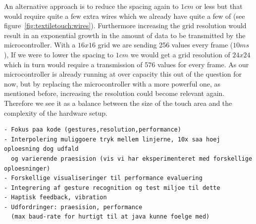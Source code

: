 An alternative approach is to reduce the spacing again to \(1cm\) or less but that would require quite a few extra wires which we already have quite a few of (see figure~\ref{fig:textiletouch:wires}).
Furthermore increasing the grid resolution would result in an exponential growth in the amount of data to be transmitted by the microcontroller.
With a \(16x16\) grid we are sending 256 values every frame (\(10ms\)),
If we were to lower the spacing to \(1cm\) we would get a grid resolution of \(24x24\) which in turn would require a transmission of 576 values for every frame.
As our microcontroller is already running at over capacity this out of the question for now, but by replacing the microcontroller with a more powerful one, as mentioned before, increasing the resolution could become relevant again.
Therefore we see it as a balance between the size of the touch area and the complexity of the hardware setup.

\begin{verbatim}
- Fokus paa kode (gestures,resolution,performance)
- Interpolering muliggoere tryk mellem linjerne, 10x saa hoej oploesning dog udfald 
  og varierende praesision (vis vi har eksperimenteret med forskellige oploesninger)
- Forskellige visualiseringer til performance evaluering
- Integrering af gesture recognition og test miljoe til dette
- Haptisk feedback, vibration
- Udfordringer: praesision, performance 
  (max baud-rate for hurtigt til at java kunne foelge med)
\end{verbatim}